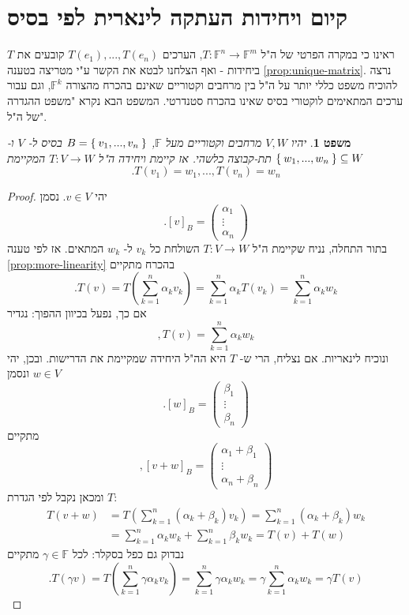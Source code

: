 \documentclass[12pt]{report}
\theoremstyle{plain}
\newtheorem{theorem}{משפט}[chapter]
\theoremstyle{definition}
\newcommand{\F}{\mathbb{F}}
\newcommand{\0}{\mathbf{0}}
\begin{document}
\section{קיום ויחידות העתקה לינארית לפי בסיס}\label{section:map-by-basis}

ראינו כי במקרה הפרטי של ה"ל 
$T:\F^n\to\F^m$,
הערכים 
$T(e_1),...,T(e_n)$
קובעים את
$T$
ביחידות - ואף הצלחנו לבטא את הקשר ע"י מטריצה בטענה
\ref{prop:unique-matrix}.
נרצה להוכיח משפט כללי יותר על ה"ל בין מרחבים וקטוריים שאינם בהכרח מהצורה 
$\F^k$,
וגם עבור ערכים המתאימים לוקטורי בסיס שאינו בהכרח סטנדרטי. המשפט הבא נקרא "משפט ההגדרה של ה"ל".

\begin{theorem}\label{thm:exist-unique}
יהיו 
$V,W$
מרחבים וקטוריים מעל
$\F$,
$B=\Set{v_1,...,v_n}$
בסיס ל-
$V$
ו-
$\Set{w_1,...,w_n}\subseteq W$
תת-קבוצה כלשהי. אז קיימת ויחידה ה"ל 
$T:V\to W$
המקיימת
$$
.T(v_1)=w_1,...,T(v_n)=w_n
$$
\end{theorem}

\begin{proof}
יהי
$v\in V$.
נסמן
$$
.[v]_B=\begin{pmatrix}\alpha_1\\ \vdots \\ \alpha_n\end{pmatrix}
$$
בתור התחלה, נניח שקיימת ה"ל
$T:V\to W$
השולחת כל 
$v_k$
ל-
$w_k$
המתאים. אז לפי טענה 
\ref{prop:more-linearity}
בהכרח מתקיים
$$
.T(v)=T(\sum_{k=1}^n \alpha_k v_k)=\sum_{k=1}^n \alpha_k T(v_k)=\sum_{k=1}^n \alpha_k w_k
$$
אם כך, נפעל בכיוון ההפוך: נגדיר
$$
,T(v)=\sum_{k=1}^n \alpha_k w_k
$$
ונוכיח לינאריות. אם נצליח, הרי ש-
$T$
היא הה"ל היחידה שמקיימת את הדרישות. ובכן, יהי
$w\in V$
ונסמן
$$
.[w]_B=\begin{pmatrix}\beta_1\\ \vdots \\ \beta_n\end{pmatrix}
$$
מתקיים
$$
,[v+w]_B=\begin{pmatrix}\alpha_1+\beta_1\\ \vdots \\ \alpha_n +\beta_n\end{pmatrix}
$$
ומכאן נקבל לפי הגדרת
$T$:
$$
\begin{aligned}
T(v+w)&=T(\sum_{k=1}^n(\alpha_k+\beta_k)v_k)=\sum_{k=1}^n(\alpha_k+\beta_k)w_k \\
&=\sum_{k=1}^n\alpha_kw_k+\sum_{k=1}^n\beta_kw_k=T(v)+T(w)
\end{aligned}
$$
נבדוק גם כפל בסקלר: לכל
$\gamma\in\F$
מתקיים
$$
.T(\gamma v)=T(\sum_{k=1}^n\gamma\alpha_kv_k)=\sum_{k=1}^n\gamma\alpha_kw_k=\gamma\sum_{k=1}^n\alpha_k w_k =\gamma T(v)
$$

\end{proof}
\end{document}

